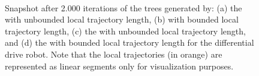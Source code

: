 \begin{figure} [h]
    \centering
    \\
    \caption{Snapshot after 2.000 iterations of the trees generated by: (a) the  with unbounded local trajectory length, (b)  with bounded local trajectory length, (c) the  with unbounded local trajectory length, and (d) the  with bounded local trajectory length for the differential drive robot.
    Note that the local trajectories (in orange) are represented as linear segments only for visualization purposes.}%
    \label{fig:unic_tree}%
\end{figure}

